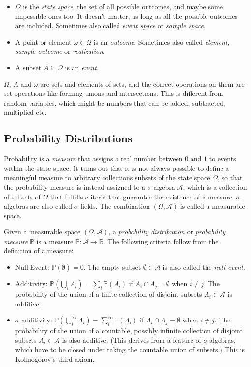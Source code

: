 \begin{itemize}
\item $\Omega$ is the \textit{state space}, the set of all possible outcomes, and maybe some impossible ones too. It doesn't matter, as long as all the possible outcomes are included. Sometimes also called \textit{event space} or \textit{sample space}. 
\item A point or element $\omega \in \Omega$ is an \textit{outcome}. Sometimes also called \textit{element}, \textit{sample outcome} or \textit{realization}. 
\item A subset $A \subseteq \Omega$ is an \textit{event}. 
\end{itemize}

$\Omega$, $A$ and $\omega$ are sets and elements of sets, and the correct operations on them are set operations like forming unions and intersections. This is different from random variables, which might be numbers that can be added, subtracted, multiplied etc.


\subsection{Probability Distributions}
Probability is a \textit{measure} that assigns a real number between $0$ and $1$ to events within the state space. It turns out that it is not always possible to define a meaningful measure to arbitrary collections subsets of the state space $\Omega$, so that the probability measure is instead assigned to a $\sigma$-algebra $\mathscr{A}$, which is a collection of subsets of $\Omega$ that fulfills criteria that guarantee the existence of a measure. $\sigma$-algebras are also called $\sigma$-fields. The combination $(\Omega, \mathscr{A})$ is called a measurable space. 

Given a measurable space $(\Omega, \mathscr{A})$, a \textit{probability distribution} or \textit{probability measure} $\mathbb{P}$ is a measure $\mathbb{P}:\mathscr{A} \rightarrow \mathbb{R}$. The following criteria follow from the definition of a measure: 

\begin{itemize}
\item Null-Event: $\mathbb{P}(\emptyset) = 0$. The empty subset $\emptyset \in \mathscr{A}$ is also called the \textit{null event}.
\item Additivity: $\mathbb{P}(\bigcup_i A_i) = \sum_i \mathbb{P}(A_i)$ if $A_i \cap A_j = \emptyset$  when $i \neq j$. The probability of the union of a finite collection of disjoint subsets $A_i \in \mathscr{A}$ is additive. 
\item $\sigma$-additivity: $\mathbb{P}(\bigcup^{\infty}_i A_i) = \sum^{\infty}_i \mathbb{P}(A_i)$ if $A_i \cap A_j = \emptyset$  when $i \neq j$. The probability of the union of a countable, possibly infinite collection of disjoint subsets $A_i \in \mathscr{A}$ is also additive. (This derives from a feature of $\sigma$-algebras, which have to be closed under taking the countable union of subsets.) This is Kolmogorov's third axiom.
\end{itemize} 

